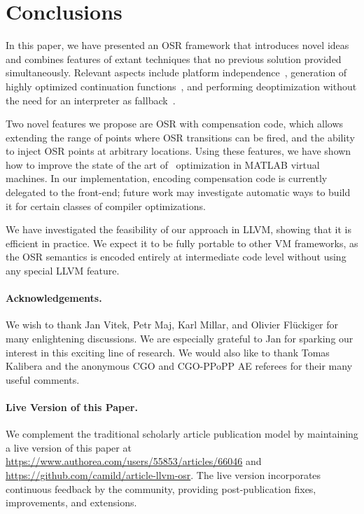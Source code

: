 
\section{Conclusions}
\label{se:conclusions}

In this paper, we have presented an OSR framework that introduces novel ideas and combines features of extant techniques that no previous solution provided simultaneously. Relevant aspects include platform independence~\cite{lameed2013modular}, generation of highly optimized continuation functions~\cite{fink2003design}, and performing deoptimization without the need for an interpreter as fallback~\cite{bebenita2010spur}.

Two novel features we propose are OSR with compensation code, which allows extending the range of points where OSR transitions can be fired, and the ability to inject OSR points at arbitrary locations. Using these features, we have shown how to improve the state of the art of \feval\ optimization in MATLAB virtual machines. In our implementation, encoding compensation code is currently delegated to the front-end; future work may investigate automatic ways to build it for certain classes of compiler optimizations.

We have investigated the feasibility of our approach in LLVM, showing that it is efficient in practice. We expect it to be fully portable to other VM frameworks, as the OSR semantics is 
encoded entirely at intermediate code level without using any special LLVM feature.

\paragraph{Acknowledgements.}

We wish to thank Jan Vitek, Petr Maj, Karl Millar, and Olivier Fl{\"u}ckiger for many enlightening discussions. We are especially grateful to Jan for sparking our interest in this exciting line of research. 
We would also like to thank Tomas Kalibera and the anonymous CGO and CGO-PPoPP AE referees for their many useful comments.

\paragraph{Live Version of this Paper.}
We complement the traditional scholarly article publication model by maintaining a live version of this paper at {\small\url{https://www.authorea.com/users/55853/articles/66046}} and {\small\url{https://github.com/camild/article-llvm-osr}}. The live version incorporates continuous feedback by the community, providing post-publication fixes, improvements, and extensions.
